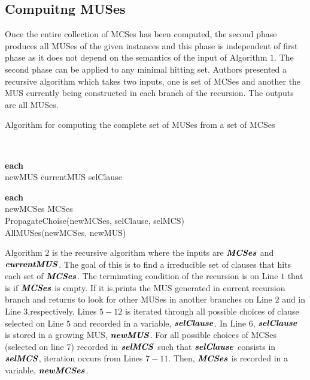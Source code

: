 \subsection{Compuitng MUSes}
Once the entire collection of MCSes has been computed, the second phase produces all MUSes of the given instances and this phase is independent of first phase as it does not depend on the semantics of the input of Algorithm $1$. The second phase can be applied to any minimal hitting set. Authors presented a recursive algorithm which takes two inputs, one is set of MCSes and another the MUS currently being constructed in each branch of the recursion. The outputs are all MUSes.\newline
\begin{Algorithm}
\caption{Algorithm for computing the complete set of MUSes from a set of MCSes}
\label{alg:allmuses}
	\begin{algorithm}{}{}
		\begin{IF}{}
			 \\
		\end{IF}
		\begin{FOR}{\textbf{each} } \\
			newMUS \= currentMUS \cup selClause \\
			\begin{FOR}{\textbf{each} } \\
				newMCSes \= MCSes \\
				PropagateChoise(newMCSes, selClause, selMCS) \\
				AllMUSes(newMCSes, newMUS) \\
			\end{FOR}
		\end{FOR}
		\RETURN
	\end{algorithm}
\end{Algorithm}
Algorithm $2$ is the recursive algorithm where the inputs are $\textbf{\textit{MCSes}}$ and $\textbf{\textit{currentMUS}}$. The goal of this is to find a irreducible set of clauses that hits each set of $\textbf{\textit{MCSes}}$. The terminating condition of the recursion is on Line $1$ that is if $\textbf{\textit{MCSes}}$ is empty. If it is,prints the MUS generated in current recursion branch and returns to look for other MUSes in another branches on Line $2$ and in Line $3$,respectively. Lines $5-12$ is iterated through all possible choices of clause selected on Line $5$ and recorded in a variable, $\textbf{\textit{selClause}}$. In Line $6$, $\textbf{\textit{selClause}}$ is stored in a growing MUS, $\textbf{\textit{newMUS}}$. For all possible choices of MCSes (selected on line $7$) recorded in $\textbf{\textit{selMCS}}$ such that $\textbf{\textit{selClause}}$ consists in $\textbf{\textit{selMCS}}$, iteration occurs from Lines $7-11$. Then, $\textbf{\textit{MCSes}}$ is recorded in a variable, $\textbf{\textit{newMCSes}}$.\newline
